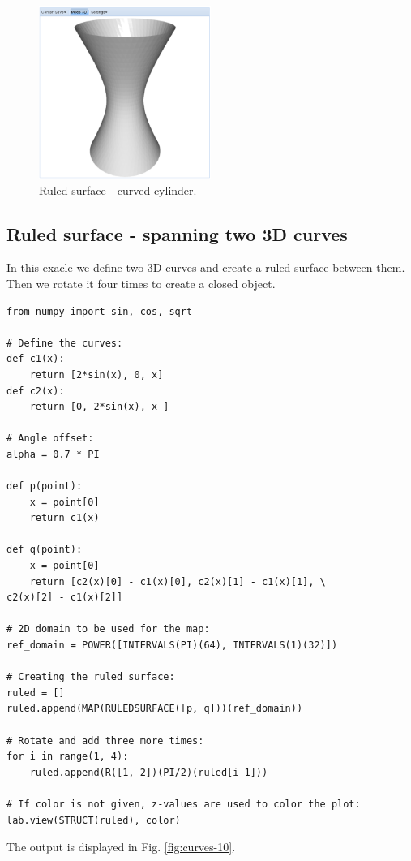 \documentclass{article}
\begin{document}
\begin{figure}[!ht]
\begin{center}
\includegraphics[width=0.5\textwidth]{img/curves-9.png}
\end{center}
\vspace{-2mm}
\caption{Ruled surface - curved cylinder.}
\label{fig:curves-9}
\end{figure}

\subsection{Ruled surface - spanning two 3D curves}

In this exacle we define two 3D curves and create a ruled surface
between them. Then we rotate it four times to create a closed object.

\begin{verbatim}
from numpy import sin, cos, sqrt

# Define the curves:
def c1(x):
    return [2*sin(x), 0, x]
def c2(x):
    return [0, 2*sin(x), x ]
  
# Angle offset:
alpha = 0.7 * PI

def p(point):
    x = point[0]
    return c1(x)
  
def q(point):
    x = point[0]
    return [c2(x)[0] - c1(x)[0], c2(x)[1] - c1(x)[1], \
c2(x)[2] - c1(x)[2]]
  
# 2D domain to be used for the map:  
ref_domain = POWER([INTERVALS(PI)(64), INTERVALS(1)(32)])

# Creating the ruled surface:
ruled = []
ruled.append(MAP(RULEDSURFACE([p, q]))(ref_domain))

# Rotate and add three more times:
for i in range(1, 4):
    ruled.append(R([1, 2])(PI/2)(ruled[i-1]))

# If color is not given, z-values are used to color the plot:
lab.view(STRUCT(ruled), color)
\end{verbatim}
The output is displayed in Fig. \ref{fig:curves-10}.
\end{document}
